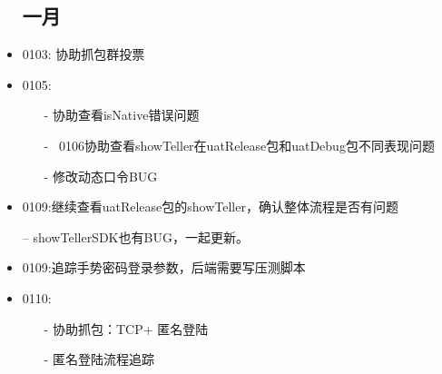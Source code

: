 \documentclass[12pt,a4paper]{ctexart}
\begin{document}
\begin{itemize}
		\subsection{一月}
		\item 0103: 协助抓包群投票
		\item 0105:
		\begin{itemize}
			\item[-] 协助查看isNative错误问题
			\item[-] ~0106协助查看showTeller在uatRelease包和uatDebug包不同表现问题
			\item[-] 修改动态口令BUG
		\end{itemize}
		\item 0109:继续查看uatRelease包的showTeller，确认整体流程是否有问题
		\item[--] showTellerSDK也有BUG，一起更新。
		\item 0109:追踪手势密码登录参数，后端需要写压测脚本
		\newpage
		\item 0110:
		\begin{itemize}
			\item[-] 协助抓包：TCP+ 匿名登陆
			\item[-] 匿名登陆流程追踪
		\end{itemize}
		
		
	\end{itemize}
\end{document}
